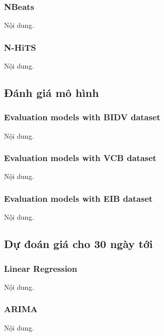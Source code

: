 \subsubsection{NBeats}
Nội dung.




\subsubsection{N-HiTS}
Nội dung.






\subsection{Đánh giá mô hình} 
\subsubsection{Evaluation models with BIDV dataset}
Nội dung.

\subsubsection{Evaluation models with VCB dataset}
Nội dung.

\subsubsection{Evaluation models with EIB dataset}
Nội dung.






\subsection{Dự đoán giá cho 30 ngày tới} 
\subsubsection{Linear Regression}
Nội dung.



\subsubsection{ARIMA}
Nội dung.




